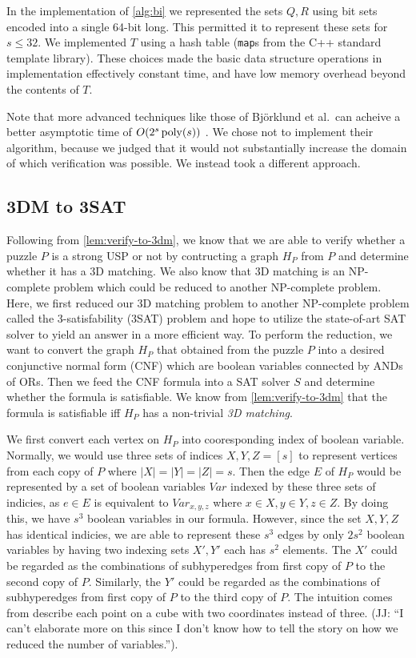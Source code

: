 \documentclass[11pt]{article}
\begin{document}
In the implementation of \autoref{alg:bi} we represented the sets
$Q,R$ using bit sets encoded into a single 64-bit long.  This
permitted it to represent these sets for $s \le 32$.  We implemented
$T$ using a hash table (\texttt{map}s from the C++ standard template library).
These choices made the basic data structure operations in
implementation effectively constant time, and have low memory overhead
beyond the contents of $T$.

Note that more advanced techniques like those of Bj\"{o}rklund et
al.~can acheive a better asymptotic time of $O(2^s\operatorname{poly}(s))$
\cite{b2010}.  We chose not to implement their algorithm, because we
judged that it would not substantially increase the domain of which
verification was possible.  We instead took a different approach.

\newpage
\subsection{3DM to 3SAT}

Following from \autoref{lem:verify-to-3dm}, we know that we are able
to verify whether a puzzle $P$ is a strong USP or not by contructing a
graph $H_P$ from $P$ and determine whether it has a 3D matching. We
also know that 3D matching is an NP-complete problem which could be
reduced to another NP-complete problem. Here, we first reduced our 3D
matching problem to another NP-complete problem called the
3-satisfability (3SAT) problem and hope to utilize the state-of-art
SAT solver to yield an answer in a more efficient way. To perform the
reduction, we want to convert the graph $H_P$ that obtained from the
puzzle $P$ into a desired conjunctive normal form (CNF) which are
boolean variables connected by ANDs of ORs. Then we feed the CNF
formula into a SAT solver $S$ and determine whether the formula is
satisfiable. We know from \autoref{lem:verify-to-3dm} that the formula
is satisfiable iff $H_P$ has a non-trivial \emph{3D matching}.

We first convert each vertex on $H_P$ into cooresponding index of
boolean variable. Normally, we would use three sets of indices $X, Y,
Z = [s]$ to represent vertices from each copy of $P$ where $|X| = |Y|
= |Z| = s$. Then the edge $E$ of $H_P$ would be represented by a set
of boolean variables $Var$ indexed by these three sets of indicies, as
$e \in E$ is equivalent to $Var_{x,y,z}$ where $x \in X, y \in Y, z
\in Z$. By doing this, we have $s^3$ boolean variables in our
formula. However, since the set $X, Y, Z$ has identical indicies, we
are able to represent these $s^3$ edges by only $2s^2$ boolean
variables by having two indexing sets $X', Y'$ each has $s^2$
elements. The $X'$ could be regarded as the combinations of
subhyperedges from first copy of $P$ to the second copy of
$P$. Similarly, the $Y'$ could be regarded as the combinations of
subhyperedges from first copy of $P$ to the third copy of $P$.  The
intuition comes from describe each point on a cube with two
coordinates instead of three. (JJ: ``I can't elaborate more on this
since I don't know how to tell the story on how we reduced the number
of variables.'').
\end{document}
